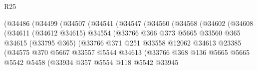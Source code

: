 \begin{lexlean}{R25}
\begin{coremodule}
                            (@34486
                              (@34499
                                (@34507
                                  (@34541
                                    (@34547
                                      (@34560
                                        (@34568
                                          (@34602
                                            (@34608
                                              (@34611
                                                (@34612 @34615)
                                                @34554
                                                (@33766
                                                  @366
                                                  @373
                                                  @5665
                                                  @33560
                                                  @365
                                                  @34615
                                                  (@33795 @365)
                                                  (@33766
                                                    @371
                                                    @251
                                                    @33558
                                                    @12062
                                                    @34613
                                                    @23385
                                                    (@34575
                                                      @370
                                                      @5667
                                                      @33557
                                                      @5544
                                                      @34613
                                                      (@33766
                                                        @368
                                                        @136
                                                        @5665
                                                        @5665
                                                        @5542
                                                        @5458
                                                        (@33934
                                                          @357
                                                          @5554
                                                          @118
                                                          @5542
                                                          @33945

\end{coremodule}
\end{lexlean}
